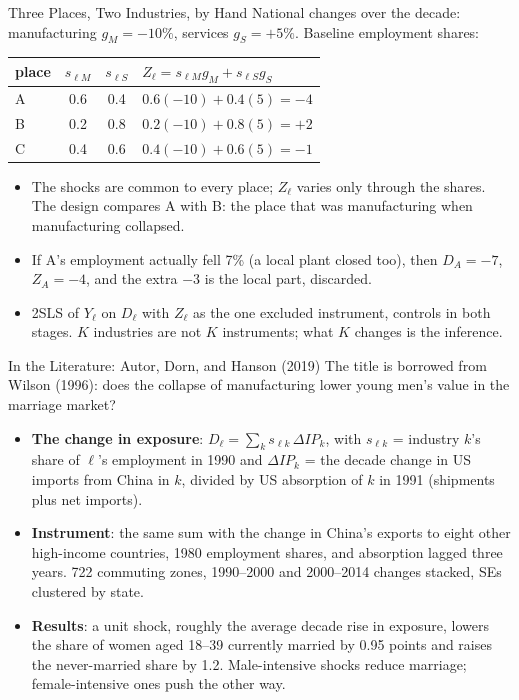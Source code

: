 \documentclass[aspectratio=169,11pt,xcolor=dvipsnames]{beamer}
\newcommand{\srct}[1]{#1}
\begin{document}
\begin{frame}{Three Places, Two Industries, by Hand}
National changes over the decade: manufacturing $g_M = -10\%$, services
$g_S = +5\%$. Baseline employment shares:
\begin{center}\small
\renewcommand{\arraystretch}{1.15}
\begin{tabular}{@{}lccl@{}}
\toprule
place & $s_{\ell M}$ & $s_{\ell S}$ & $Z_\ell = s_{\ell M} g_M + s_{\ell S} g_S$ \\
\midrule
A & 0.6 & 0.4 & $0.6(-10) + 0.4(5) = -4$ \\
B & 0.2 & 0.8 & $0.2(-10) + 0.8(5) = +2$ \\
C & 0.4 & 0.6 & $0.4(-10) + 0.6(5) = -1$ \\
\bottomrule
\end{tabular}
\end{center}
\vskip2pt
\begin{itemize}\itemsep2pt
  \item The shocks are common to every place; $Z_\ell$ varies only through
        the shares. The design compares A with B: the place that was
        manufacturing when manufacturing collapsed.
  \item If A's employment actually fell 7\% (a local plant closed too), then
        $D_A = -7$, $Z_A = -4$, and the extra $-3$ is the local part, discarded.
  \item 2SLS of $Y_\ell$ on $D_\ell$ with $Z_\ell$ as the one excluded
        instrument, controls in both stages. $K$ industries are not $K$
        instruments; what $K$ changes is the inference.
\end{itemize}
\end{frame}

\begin{frame}{In the Literature: Autor, Dorn, and Hanson (2019)}
The title is borrowed from \srct{Wilson (1996)}: does the collapse of
manufacturing lower young men's value in the marriage market?
\vskip3pt
\begin{itemize}\itemsep3pt
  \item \textbf{The change in exposure}: $D_\ell = \sum_k s_{\ell k}\,\Delta IP_k$,
        with $s_{\ell k}$ = industry $k$'s share of $\ell$'s employment in 1990
        and $\Delta IP_k$ = the decade change in US imports from China in $k$,
        divided by US absorption of $k$ in 1991 (shipments plus net imports).
  \item \textbf{Instrument}: the same sum with the change in China's exports
        to eight other high-income countries, 1980 employment shares, and
        absorption lagged three years. 722 commuting zones, 1990--2000 and
        2000--2014 changes stacked, SEs clustered by state.
  \item \textbf{Results}: a unit shock, roughly the average decade rise in
        exposure, lowers the share of women aged 18--39 currently married by
        0.95 points and raises the never-married share by 1.2. Male-intensive
        shocks reduce marriage; female-intensive ones push the other way.
\end{itemize}
\end{frame}
\end{document}
